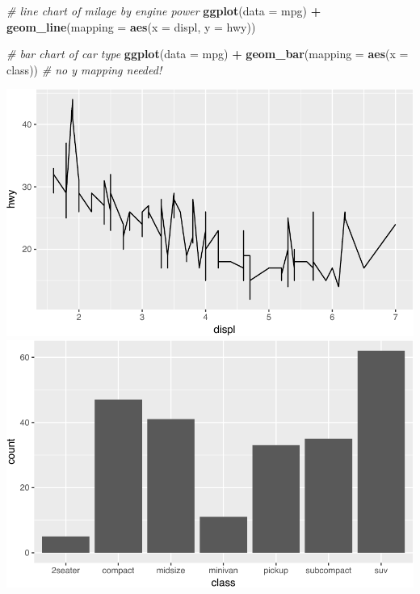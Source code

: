 \documentclass[]{book}
\newenvironment{Shaded}{\begin{snugshade}}{\end{snugshade}}
\newcommand{\KeywordTok}[1]{\textcolor[rgb]{0.13,0.29,0.53}{\textbf{#1}}}
\newcommand{\DataTypeTok}[1]{\textcolor[rgb]{0.13,0.29,0.53}{#1}}
\newcommand{\StringTok}[1]{\textcolor[rgb]{0.31,0.60,0.02}{#1}}
\newcommand{\CommentTok}[1]{\textcolor[rgb]{0.56,0.35,0.01}{\textit{#1}}}
\newcommand{\OperatorTok}[1]{\textcolor[rgb]{0.81,0.36,0.00}{\textbf{#1}}}
\newcommand{\NormalTok}[1]{#1}
\theoremstyle{definition}
\theoremstyle{definition}
\theoremstyle{remark}
\begin{document}
\begin{Shaded}
\begin{Highlighting}[]
\CommentTok{# line chart of milage by engine power}
\KeywordTok{ggplot}\NormalTok{(}\DataTypeTok{data =}\NormalTok{ mpg) }\OperatorTok{+}
\StringTok{  }\KeywordTok{geom_line}\NormalTok{(}\DataTypeTok{mapping =} \KeywordTok{aes}\NormalTok{(}\DataTypeTok{x =}\NormalTok{ displ, }\DataTypeTok{y =}\NormalTok{ hwy))}

\CommentTok{# bar chart of car type}
\KeywordTok{ggplot}\NormalTok{(}\DataTypeTok{data =}\NormalTok{ mpg) }\OperatorTok{+}
\StringTok{  }\KeywordTok{geom_bar}\NormalTok{(}\DataTypeTok{mapping =} \KeywordTok{aes}\NormalTok{(}\DataTypeTok{x =}\NormalTok{ class))  }\CommentTok{# no y mapping needed!}
\end{Highlighting}
\end{Shaded}

\includegraphics[width=380pt]{img/ggplot2/geom_examples-1}
\includegraphics[width=380pt]{img/ggplot2/geom_examples-2}
\end{document}
